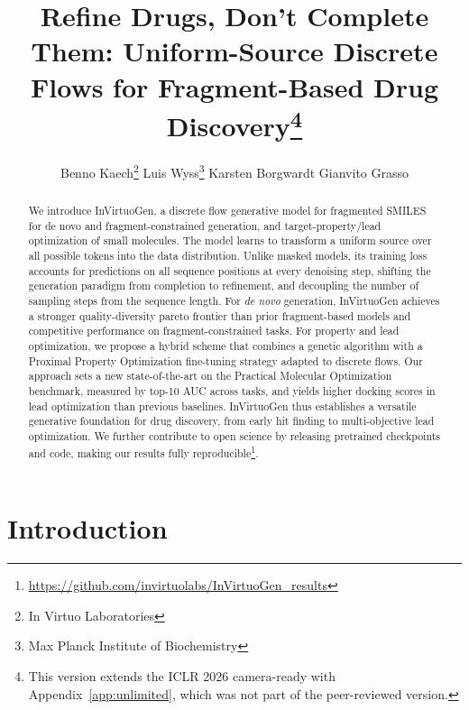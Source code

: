 \documentclass{article} %
\title{Refine Drugs, Don’t Complete Them: Uniform-Source Discrete Flows for Fragment-Based Drug Discovery\thanks{This version extends the ICLR 2026 camera-ready with Appendix~\ref{app:unlimited}, which was not part of the peer-reviewed version.}}
\author{
Benno Kaech\thanks{In Virtuo Laboratories} \And
Luis Wyss\thanks{Max Planck Institute of Biochemistry} \And
Karsten Borgwardt\footnotemark[3] \And
Gianvito Grasso\footnotemark[2] \\
}
\begin{document}
\maketitle


\begin{abstract}
We introduce InVirtuoGen, a discrete flow generative model for fragmented SMILES for de novo and fragment-constrained generation, and target-property/lead optimization of small molecules. The model learns to transform a uniform source over all possible tokens into the data distribution. Unlike masked models, its training loss accounts for predictions on all sequence positions at every denoising step, shifting the generation paradigm from completion to refinement, and decoupling the number of sampling steps from the sequence length. For \textit{de novo} generation, InVirtuoGen achieves a stronger quality-diversity pareto frontier than prior fragment-based models and competitive performance on fragment-constrained tasks. For property and lead optimization, we propose a hybrid scheme that combines a genetic algorithm with a Proximal Property Optimization fine-tuning strategy adapted to discrete flows. Our approach sets a new state-of-the-art on the Practical Molecular Optimization benchmark, measured by top-10 AUC across tasks, and yields higher docking scores in lead optimization than previous baselines. InVirtuoGen thus establishes a versatile generative foundation for drug discovery, from early hit finding to multi-objective lead optimization. We further contribute to open science by releasing pretrained checkpoints and code, making our results fully reproducible\footnote{\url{https://github.com/invirtuolabs/InVirtuoGen_results}}.
\end{abstract}

\section{Introduction}
\end{document}
